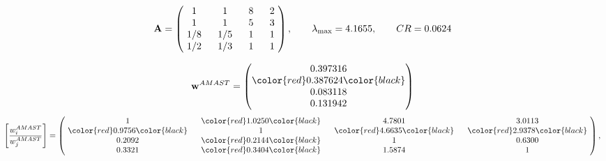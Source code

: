 \begin{example}
\begin{equation*}
\mathbf{A} =
\begin{pmatrix}
$\,\,$ 1 $\,\,$ & $\,\,$1$\,\,$ & $\,\,$8$\,\,$ & $\,\,$2 $\,\,$ \\
$\,\,$ 1 $\,\,$ & $\,\,$ 1 $\,\,$ & $\,\,$5$\,\,$ & $\,\,$3 $\,\,$ \\
$\,\,$ 1/8$\,\,$ & $\,\,$ 1/5$\,\,$ & $\,\,$ 1 $\,\,$ & $\,\,$1 $\,\,$ \\
$\,\,$ 1/2$\,\,$ & $\,\,$ 1/3$\,\,$ & $\,\,$ 1 $\,\,$ & $\,\,$ 1  $\,\,$ \\
\end{pmatrix},
\qquad
\lambda_{\max} =
4.1655,
\qquad
CR = 0.0624
\end{equation*}

\begin{equation*}
\mathbf{w}^{AMAST} =
\begin{pmatrix}
0.397316\\
\color{red} 0.387624\color{black} \\
0.083118\\
0.131942
\end{pmatrix}\end{equation*}
\begin{equation*}
\left[ \frac{{w}^{AMAST}_i}{{w}^{AMAST}_j} \right] =
\begin{pmatrix}
$\,\,$ 1 $\,\,$ & $\,\,$\color{red} 1.0250\color{black} $\,\,$ & $\,\,$4.7801$\,\,$ & $\,\,$3.0113$\,\,$ \\
$\,\,$\color{red} 0.9756\color{black} $\,\,$ & $\,\,$ 1 $\,\,$ & $\,\,$\color{red} 4.6635\color{black} $\,\,$ & $\,\,$\color{red} 2.9378\color{black}   $\,\,$ \\
$\,\,$0.2092$\,\,$ & $\,\,$\color{red} 0.2144\color{black} $\,\,$ & $\,\,$ 1 $\,\,$ & $\,\,$0.6300 $\,\,$ \\
$\,\,$0.3321$\,\,$ & $\,\,$\color{red} 0.3404\color{black} $\,\,$ & $\,\,$1.5874$\,\,$ & $\,\,$ 1  $\,\,$ \\
\end{pmatrix},
\end{equation*}


\end{example}

